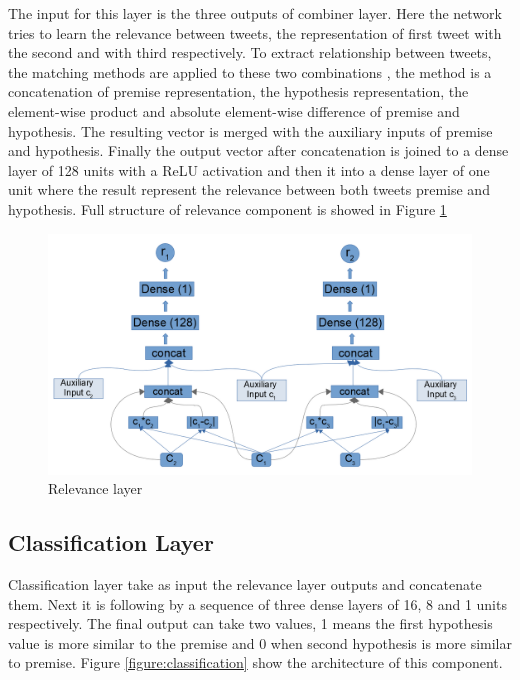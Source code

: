 \documentclass[12pt]{report}
\begin{document}
The input for this layer is the three outputs of combiner layer. Here the network tries to learn the relevance between tweets, the representation of first tweet with the second and with third respectively. To extract relationship between tweets, the matching methods are applied to these two combinations \cite{Conneau2017}, the method is a concatenation of premise representation, the hypothesis representation, the element-wise product and absolute element-wise difference of premise and hypothesis. The resulting vector is merged with the auxiliary inputs of premise and hypothesis. Finally the output vector after concatenation is joined to a dense layer of 128 units with a {ReLU} activation and then it into a dense layer of one unit where the result represent the relevance between both tweets premise and hypothesis. Full structure of relevance component is showed in Figure \ref{figure:relevance}

\begin{figure}[H]	
	\centering
	\includegraphics[width=150mm, scale = 1]{images/14_relevance.png}	
	\caption{Relevance layer}	
	\label{figure:relevance}
\end{figure}

\subsection{Classification Layer}

Classification layer take as input the relevance layer outputs and concatenate them. Next it is following by a sequence of three dense layers of 16, 8 and 1 units respectively. The final output can take two values, 1 means the first hypothesis value is more similar to the premise and 0 when second hypothesis is more similar to premise. Figure \ref{figure:classification} show the architecture of this component.
\end{document}
